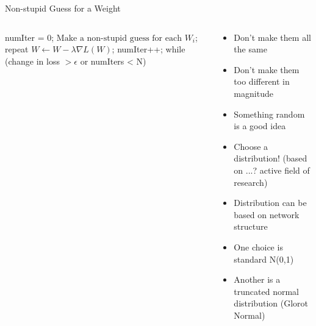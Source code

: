 \documentclass[aspectratio=169]{beamer}
\begin{document}
\begin{frame}[fragile]{Non-stupid Guess for a Weight}

\begin{columns}
\begin{column}{0.4\textwidth}
\begin{SQL}
numIter = 0;
$\textrm{Make a non-stupid guess for each } W_i$;
repeat {
  $W \leftarrow W - \lambda \nabla L (W)$;
  numIter++;
} while (change in loss $> \epsilon$ 
		or numIters < N)
\end{SQL}
\end{column}
\begin{column}{0.6\textwidth}

\begin{itemize}
	\item Don't make them all the same
	\item Don't make them too different in magnitude %
	\item Something random is a good idea
	\item Choose a distribution! (based on ...? active field of research)
	\item Distribution can be based on network structure
	\item One choice  is standard N(0,1)
	\item Another is a truncated normal distribution  (Glorot Normal)
\end{itemize}
\end{column}
\end{columns}

\end{frame}
\end{document}
